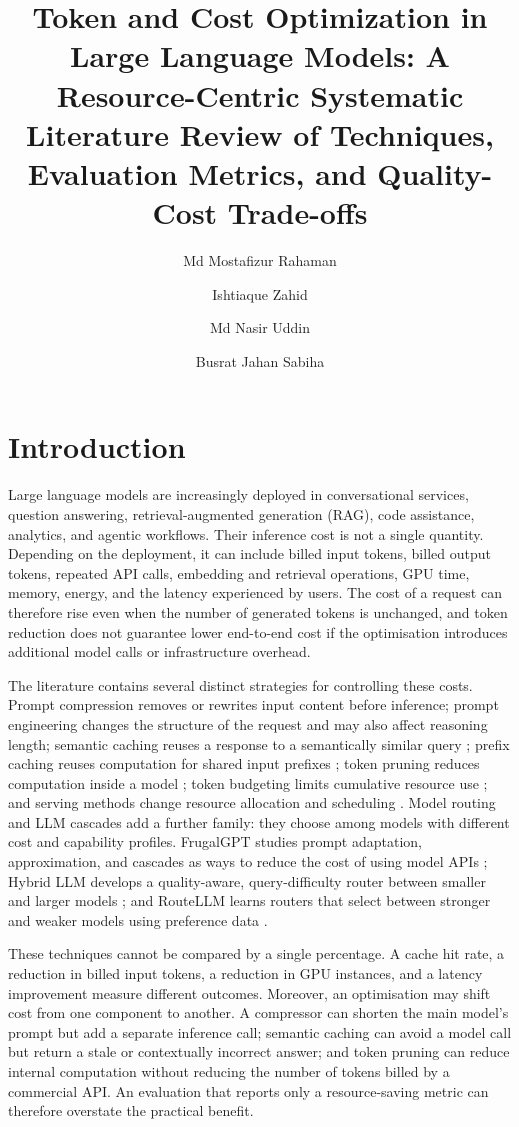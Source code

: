 \IfFileExists{jair.cls}{\documentclass{jair}}{\documentclass[manuscript,nonacm,screen]{acmart}}
\title{Token and Cost Optimization in Large Language Models: A Resource-Centric Systematic Literature Review of Techniques, Evaluation Metrics, and Quality-Cost Trade-offs}
\author{Md Mostafizur Rahaman}
\affiliation{
  \institution{Institute of Information Technology, University of Dhaka}
  \city{Dhaka}
  \country{Bangladesh}
}
\author{Ishtiaque Zahid}
\affiliation{
  \institution{Shahjalal University of Science and Technology}
  \city{Sylhet}
  \country{Bangladesh}
}
\author{Md Nasir Uddin}
\affiliation{
  \institution{Institute of Information Technology, University of Dhaka}
  \city{Dhaka}
  \country{Bangladesh}
}
\author{Busrat Jahan Sabiha}
\affiliation{
  \institution{Institute of Information Technology, University of Dhaka}
  \city{Dhaka}
  \country{Bangladesh}
}
\begin{document}
\maketitle
\pagestyle{plain}

\section{Introduction}

Large language models are increasingly deployed in conversational services, question answering, retrieval-augmented generation (RAG), code assistance, analytics, and agentic workflows. Their inference cost is not a single quantity. Depending on the deployment, it can include billed input tokens, billed output tokens, repeated API calls, embedding and retrieval operations, GPU time, memory, energy, and the latency experienced by users. The cost of a request can therefore rise even when the number of generated tokens is unchanged, and token reduction does not guarantee lower end-to-end cost if the optimisation introduces additional model calls or infrastructure overhead.

The literature contains several distinct strategies for controlling these costs. Prompt compression removes or rewrites input content before inference; prompt engineering changes the structure of the request and may also affect reasoning length; semantic caching reuses a response to a semantically similar query \cite{S15,S21,S32}; prefix caching reuses computation for shared input prefixes \cite{S01,S14,S34}; token pruning reduces computation inside a model \cite{S07,S33}; token budgeting limits cumulative resource use \cite{S28,S40}; and serving methods change resource allocation and scheduling \cite{S22,S24}. Model routing and LLM cascades add a further family: they choose among models with different cost and capability profiles. FrugalGPT studies prompt adaptation, approximation, and cascades as ways to reduce the cost of using model APIs \cite{FrugalGPT}; Hybrid LLM develops a quality-aware, query-difficulty router between smaller and larger models \cite{HybridLLM}; and RouteLLM learns routers that select between stronger and weaker models using preference data \cite{RouteLLM}.

These techniques cannot be compared by a single percentage. A cache hit rate, a reduction in billed input tokens, a reduction in GPU instances, and a latency improvement measure different outcomes. Moreover, an optimisation may shift cost from one component to another. A compressor can shorten the main model's prompt but add a separate inference call; semantic caching can avoid a model call but return a stale or contextually incorrect answer; and token pruning can reduce internal computation without reducing the number of tokens billed by a commercial API. An evaluation that reports only a resource-saving metric can therefore overstate the practical benefit.
\end{document}
